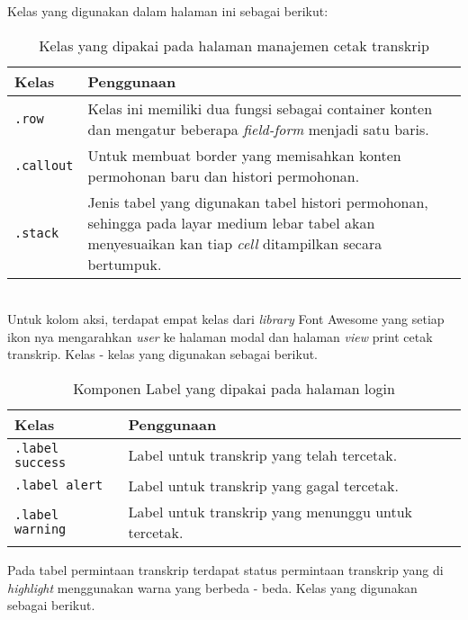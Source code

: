 Kelas yang digunakan dalam halaman ini sebagai berikut:\\
\begin{table}[H]
	\centering
	\begin{tabularx}{\textwidth}{lX}
		\toprule
		Kelas     & Penggunaan \\
		\midrule
		\texttt{.row} & Kelas ini memiliki dua fungsi sebagai container konten dan mengatur beberapa \textit{field-form} menjadi satu baris.\\
		\texttt{.callout} & Untuk membuat border yang memisahkan konten permohonan baru dan histori permohonan.\\
		\texttt{.stack} & Jenis tabel yang digunakan tabel histori permohonan, sehingga pada layar medium lebar tabel akan menyesuaikan kan tiap \textit{cell} ditampilkan secara bertumpuk.\\
		\bottomrule
	\end{tabularx}%
	\caption{Kelas yang dipakai pada halaman manajemen cetak transkrip}
\end{table} \\


\noindent Untuk kolom aksi, terdapat empat kelas dari \textit{library} Font Awesome yang setiap ikon nya mengarahkan \textit{user} ke halaman modal dan halaman \textit{view} print cetak transkrip. Kelas - kelas yang digunakan sebagai berikut.\\

\begin{table}[H]
	\centering
	\begin{tabularx}{\textwidth}{lX}
		\toprule
		Kelas     & Penggunaan \\
		\midrule
		\texttt{.label success} & Label untuk transkrip yang telah tercetak.\\
		\texttt{.label alert} & Label untuk transkrip yang gagal tercetak.\\
		\texttt{.label warning} & Label untuk transkrip yang menunggu untuk tercetak.\\		
		\bottomrule
	\end{tabularx}%
	\caption{Komponen Label yang dipakai pada halaman login}
\end{table}%

\noindent Pada tabel permintaan transkrip terdapat status permintaan transkrip yang di \textit{highlight} menggunakan warna yang berbeda - beda. Kelas yang digunakan sebagai berikut.\\

